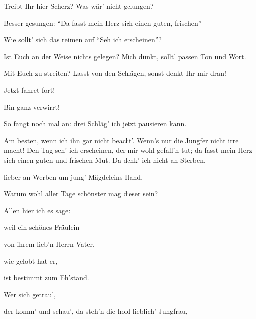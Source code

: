 \begin{drama}

Treibt Ihr hier Scherz? Was wär' nicht gelungen?

\Sachsspeaks
Besser gesungen:
``Da fasst mein Herz sich einen guten, frischen''

\Beckmesserspeaks
Wie sollt' sich das reimen
auf ``Seh ich erscheinen''?

\Sachsspeaks
Ist Euch an der Weise nichts gelegen?
Mich dünkt, sollt' passen Ton und Wort.

\Beckmesserspeaks
Mit Euch zu streiten?
Lasst von den Schlägen,
sonst denkt Ihr mir dran!

\Sachsspeaks
Jetzt fahret fort!

\Beckmesserspeaks
Bin ganz verwirrt!

\Sachsspeaks
So fangt noch mal an:
drei Schläg' ich jetzt pausieren kann.

\Beckmesserspeaks


Am besten, wenn ich ihn gar nicht beacht'.
Wenn's nur die Jungfer nicht irre macht!
Den Tag seh' ich erscheinen,
der mir wohl gefall'n tut;
da fasst mein Herz sich einen
guten und frischen Mut.
Da denk' ich nicht an Sterben,


lieber an Werben
um jung' Mägdeleins Hand.


Warum wohl aller Tage
schönster mag dieser sein?


Allen hier ich es sage:


weil ein schönes Fräulein


von ihrem lieb'n Herrn Vater,


wie gelobt hat er,


ist bestimmt zum Eh'stand.


Wer sich getrau',


der komm' und schau',
da steh'n die hold lieblich' Jungfrau,


\end{drama}
